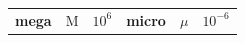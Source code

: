 {\begin{tabular}[t]{|l|l|l|l|l|l|}
    
        
                \textbf{mega}
               &
    
    
        M &
    
    
        
                \begin{math}{10}^{6}\end{math}
               &
    
    
        
                \textbf{micro}
               &
    
    
        
                \begin{math}\mu \end{math}
               &
    
    
        
                \begin{math}{10}^{-6}\end{math}
     \tabularnewline\cline{1-1}\cline{2-2}\cline{3-3}\cline{4-4}\cline{5-5}\cline{6-6}
    
    

\end{tabular}}
